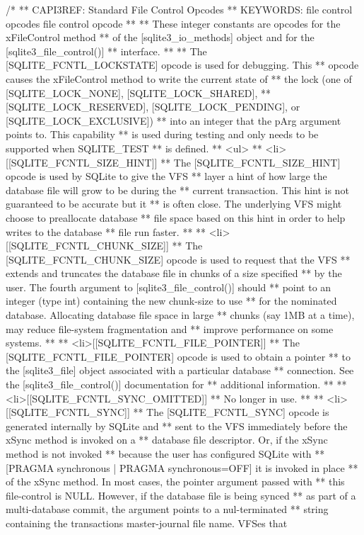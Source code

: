 \begin{Codex}[label=sqlite3.h,numbers=left]
{/*
** CAPI3REF: Standard File Control Opcodes
** KEYWORDS: {file control opcodes} {file control opcode}
**
** These integer constants are opcodes for the xFileControl method
** of the [sqlite3_io_methods] object and for the [sqlite3_file_control()]
** interface.
**
** The [SQLITE_FCNTL_LOCKSTATE] opcode is used for debugging.  This
** opcode causes the xFileControl method to write the current state of
** the lock (one of [SQLITE_LOCK_NONE], [SQLITE_LOCK_SHARED],
** [SQLITE_LOCK_RESERVED], [SQLITE_LOCK_PENDING], or [SQLITE_LOCK_EXCLUSIVE])
** into an integer that the pArg argument points to. This capability
** is used during testing and only needs to be supported when SQLITE_TEST
** is defined.
** <ul>
** <li>[[SQLITE_FCNTL_SIZE_HINT]]
** The [SQLITE_FCNTL_SIZE_HINT] opcode is used by SQLite to give the VFS
** layer a hint of how large the database file will grow to be during the
** current transaction.  This hint is not guaranteed to be accurate but it
** is often close.  The underlying VFS might choose to preallocate database
** file space based on this hint in order to help writes to the database
** file run faster.
**
** <li>[[SQLITE_FCNTL_CHUNK_SIZE]]
** The [SQLITE_FCNTL_CHUNK_SIZE] opcode is used to request that the VFS
** extends and truncates the database file in chunks of a size specified
** by the user. The fourth argument to [sqlite3_file_control()] should 
** point to an integer (type int) containing the new chunk-size to use
** for the nominated database. Allocating database file space in large
** chunks (say 1MB at a time), may reduce file-system fragmentation and
** improve performance on some systems.
**
** <li>[[SQLITE_FCNTL_FILE_POINTER]]
** The [SQLITE_FCNTL_FILE_POINTER] opcode is used to obtain a pointer
** to the [sqlite3_file] object associated with a particular database
** connection.  See the [sqlite3_file_control()] documentation for
** additional information.
**
** <li>[[SQLITE_FCNTL_SYNC_OMITTED]]
** No longer in use.
**
** <li>[[SQLITE_FCNTL_SYNC]]
** The [SQLITE_FCNTL_SYNC] opcode is generated internally by SQLite and
** sent to the VFS immediately before the xSync method is invoked on a
** database file descriptor. Or, if the xSync method is not invoked 
** because the user has configured SQLite with 
** [PRAGMA synchronous | PRAGMA synchronous=OFF] it is invoked in place 
** of the xSync method. In most cases, the pointer argument passed with
** this file-control is NULL. However, if the database file is being synced
** as part of a multi-database commit, the argument points to a nul-terminated
** string containing the transactions master-journal file name. VFSes that 
}
\end{Codex}
